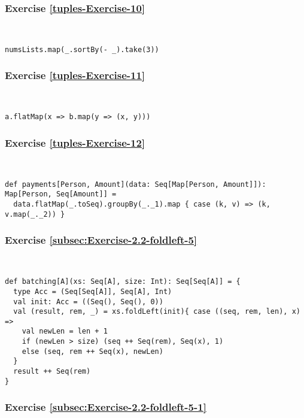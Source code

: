 
\subsubsection*{Exercise \ref{tuples-Exercise-10}}

~
\begin{lstlisting}
numsLists.map(_.sortBy(- _).take(3))
\end{lstlisting}


\subsubsection*{Exercise \ref{tuples-Exercise-11}}

~
\begin{lstlisting}
a.flatMap(x => b.map(y => (x, y)))
\end{lstlisting}


\subsubsection*{Exercise \ref{tuples-Exercise-12}}

~
\begin{lstlisting}
def payments[Person, Amount](data: Seq[Map[Person, Amount]]): Map[Person, Seq[Amount]] =
  data.flatMap(_.toSeq).groupBy(_._1).map { case (k, v) => (k, v.map(_._2)) }
\end{lstlisting}


\subsubsection*{Exercise \ref{subsec:Exercise-2.2-foldleft-5}}

~
\begin{lstlisting}
def batching[A](xs: Seq[A], size: Int): Seq[Seq[A]] = {  
  type Acc = (Seq[Seq[A]], Seq[A], Int)
  val init: Acc = ((Seq(), Seq(), 0))
  val (result, rem, _) = xs.foldLeft(init){ case ((seq, rem, len), x) =>
    val newLen = len + 1
    if (newLen > size) (seq ++ Seq(rem), Seq(x), 1)
    else (seq, rem ++ Seq(x), newLen)
  }
  result ++ Seq(rem)
}
\end{lstlisting}


\subsubsection*{Exercise \ref{subsec:Exercise-2.2-foldleft-5-1}}

